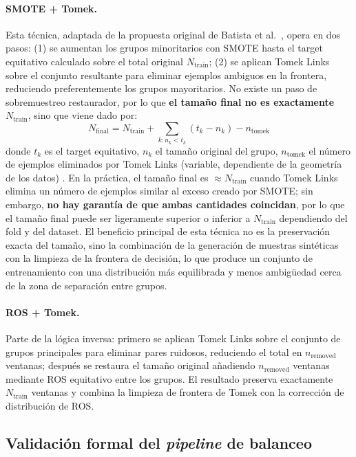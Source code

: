 \paragraph{SMOTE + Tomek.}
Esta técnica, adaptada de la propuesta original de Batista et al.~\cite{batista2004study}, opera en dos pasos: (1) se aumentan los grupos minoritarios con SMOTE hasta el target equitativo calculado sobre el total original $N_\text{train}$; (2) se aplican Tomek Links sobre el conjunto resultante para eliminar ejemplos ambiguos en la frontera, reduciendo preferentemente los grupos mayoritarios. No existe un paso de sobremuestreo restaurador, por lo que \textbf{el tamaño final no es exactamente $N_\text{train}$}, sino que viene dado por:
\begin{equation}
  N_\text{final} = N_\text{train} + \sum_{k: n_k < t_k} (t_k - n_k) - n_\text{tomek} 
  \label{eq:smote_tomek_final}
\end{equation}
donde $t_k$ es el target equitativo, $n_k$ el tamaño original del grupo, $n_\text{tomek}$ el número de ejemplos eliminados por Tomek Links (variable, dependiente de la geometría de los datos) . En la práctica, el tamaño final es $\approx N_\text{train}$ cuando Tomek Links elimina un número de ejemplos similar al exceso creado por SMOTE; sin embargo, \textbf{no hay garantía de que ambas cantidades coincidan}, por lo que el tamaño final puede ser ligeramente superior o inferior a $N_\text{train}$ dependiendo del fold y del dataset. El beneficio principal de esta técnica no es la preservación exacta del tamaño, sino la combinación de la generación de muestras sintéticas con la limpieza de la frontera de decisión, lo que produce un conjunto de entrenamiento con una distribución más equilibrada y menos ambigüedad cerca de la zona de separación entre grupos.
\paragraph{ROS + Tomek.}
Parte de la lógica inversa: primero se aplican Tomek Links sobre el conjunto de grupos principales para eliminar pares ruidosos, reduciendo el total en $n_\text{removed}$ ventanas; después se restaura el tamaño original añadiendo $n_\text{removed}$ ventanas mediante ROS equitativo entre los grupos. El resultado preserva exactamente $N_\text{train}$ ventanas y combina la limpieza de frontera de Tomek con la corrección de distribución de ROS.

\subsection{Validación formal del \emph{pipeline} de balanceo}
\label{subsec:validacion_pipeline}

